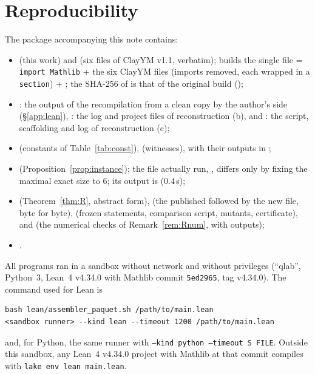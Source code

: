 \documentclass[11pt,a4paper]{article}
\theoremstyle{plain}
\theoremstyle{definition}
\theoremstyle{remark}
\numberwithin{equation}{section}
\begin{document}
\section{Reproducibility}\label{sec:repro}
The package accompanying this note contains:
\begin{itemize}
\item {} (this work) and  (six files of ClayYM v1.1, verbatim);
 builds the single file  = \texttt{import Mathlib} + the six ClayYM files (imports
removed, each wrapped in a \texttt{section}) + ; the SHA-256 of  is that of the original build
();
\item {}: the output of the recompilation from a clean copy by the author's side (\S\ref{app:lean}), 
: the log and project files of reconstruction (b), and : the script, scaffolding and log of reconstruction (c);
\item {} (constants of Table~\ref{tab:const}),  (witnesses), with their
outputs in ;
\item {} (Proposition~\ref{prop:instance}); the file actually run, , differs
only by fixing the maximal exact size to $6$; its output is  ($0.4$\,s);
\item {} (Theorem~\ref{thm:R}, abstract form),  (the published  followed by the new file, byte for byte),  (frozen statements, comparison script, mutants, certificate), and  (the numerical checks of Remark~\ref{rem:Rnum}, with outputs);
\item {}.
\end{itemize}
All programs ran in a sandbox without network and without privileges (``qlab'', Python~3, Lean~4 v4.34.0 with Mathlib commit
\texttt{5ed2965}, tag v4.34.0). The command used for Lean is
{\footnotesize
\begin{verbatim}
bash lean/assembler_paquet.sh /path/to/main.lean
<sandbox runner> --kind lean --timeout 1200 /path/to/main.lean
\end{verbatim}}
\noindent and, for Python, the same runner with \texttt{--kind python --timeout S FILE}. Outside this sandbox, any Lean~4 v4.34.0 project with
Mathlib at that commit compiles  with \texttt{lake env lean main.lean}.
\end{document}

